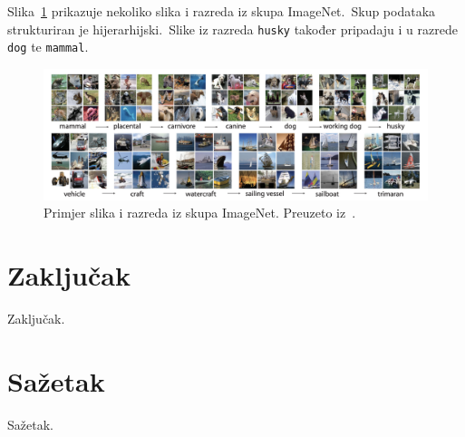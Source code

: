 \documentclass[times, utf8, seminar, numeric]{fer}
\begin{document}
Slika~\ref{fig:imagenet} prikazuje nekoliko slika i razreda iz skupa ImageNet.\ Skup podataka strukturiran je hijerarhijski.\ Slike iz razreda \texttt{husky} također pripadaju i u razrede \texttt{dog} te \texttt{mammal}.\

\begin{figure}[h]
    \centering
    \includegraphics[scale=0.33]{./Slike/imagenet.png}
    \caption{Primjer slika i razreda iz skupa ImageNet. Preuzeto iz~\cite{deng2009imagenet}.}
    \label{fig:imagenet}
\end{figure}

\chapter{Zaključak}
Zaključak.




\chapter{Sažetak}
Sažetak.
\end{document}
